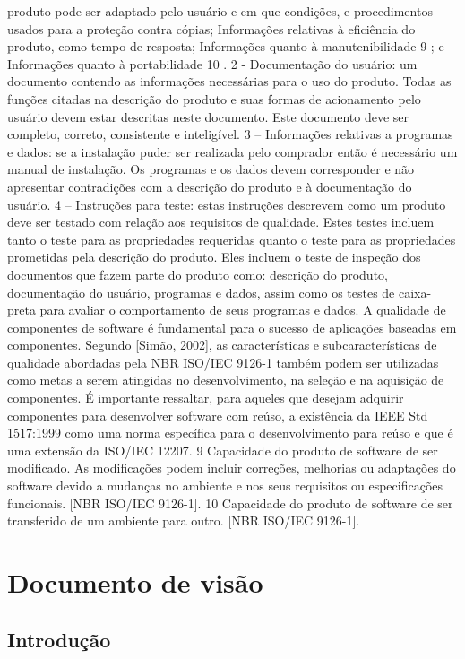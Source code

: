 produto pode ser adaptado pelo usuário e em que condições, e
procedimentos usados para a proteção contra cópias;
Informações relativas à eficiência do produto, como tempo de
resposta;
Informações quanto à manutenibilidade 9 ; e
Informações quanto à portabilidade 10 .
2 - Documentação do usuário: um documento contendo as informações
necessárias para o uso do produto. Todas as funções citadas na descrição
do produto e suas formas de acionamento pelo usuário devem estar
descritas neste documento. Este documento deve ser completo, correto,
consistente e inteligível.
3 – Informações relativas a programas e dados: se a instalação puder
ser realizada pelo comprador então é necessário um manual de
instalação. Os programas e os dados devem corresponder e não
apresentar contradições com a descrição do produto e à documentação do
usuário.
4 – Instruções para teste: estas instruções descrevem como um produto
deve ser testado com relação aos requisitos de qualidade. Estes testes
incluem tanto o teste para as propriedades requeridas quanto o teste para
as propriedades prometidas pela descrição do produto. Eles incluem o
teste de inspeção dos documentos que fazem parte do produto como:
descrição do produto, documentação do usuário, programas e dados,
assim como os testes de caixa-preta para avaliar o comportamento de
seus programas e dados.
A qualidade de componentes de software é fundamental para o sucesso de
aplicações baseadas em componentes.
Segundo [Simão, 2002], as características e subcaracterísticas de qualidade
abordadas pela NBR ISO/IEC 9126-1 também podem ser utilizadas como metas a
serem atingidas no desenvolvimento, na seleção e na aquisição de componentes.
É importante ressaltar, para aqueles que desejam adquirir componentes para
desenvolver software com reúso, a existência da IEEE Std 1517:1999 como uma
norma específica para o desenvolvimento para reúso e que é uma extensão da
ISO/IEC 12207.
9
Capacidade do produto de software de ser modificado. As modificações podem incluir correções,
melhorias ou adaptações do software devido a mudanças no ambiente e nos seus requisitos ou
especificações funcionais. [NBR ISO/IEC 9126-1].
10
Capacidade do produto de software de ser transferido de um ambiente para outro.
[NBR ISO/IEC 9126-1].


\chapter{Documento de visão}
\section{Introdução}

